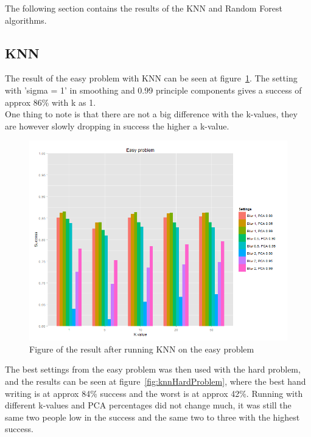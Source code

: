 \documentclass[report]{subfiles}
\begin{document}
\label{sec:result}
The following section contains the results of the KNN and Random Forest algorithms.

\subsection{KNN}
\label{sec:resultKNN}
The result of the easy problem with KNN can be seen at figure~\ref{fig:knnEasyProblem}. The setting with 'sigma = 1' in smoothing and 0.99 principle components gives a success of approx 86\% with k as 1.\\
One thing to note is that there are not a big difference with the k-values, they are however slowly dropping in success the higher a k-value.

\begin{figure}[H]
	\centering
	\includegraphics[width=1\textwidth]{images/knnEasyProblem}
	\caption{Figure of the result after running KNN on the easy problem}
	\label{fig:knnEasyProblem}
\end{figure}

The best settings from the easy problem was then used with the hard problem, and the results can be seen at figure~\ref{fig:knnHardProblem}, where the best hand writing is at approx 84\% success and the worst is at approx 42\%. Running with different k-values and PCA percentages did not change much, it was still the same two people low in the success and the same two to three with the highest success.
\end{document}
